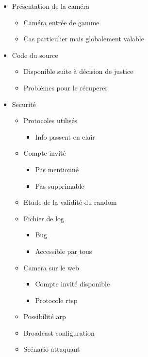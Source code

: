 \begin{itemize}
\item Présentation de la caméra
  \begin{itemize}
  \item Caméra entrée de gamme
  \item Cas particulier mais globalement valable
  \end{itemize}
\item Code du source
  \begin{itemize}
  \item Disponible suite à décision de justice
  \item Problèmes pour le récuperer
  \end{itemize}
\item Securité
  \begin{itemize}
  \item Protocoles utilisés
    \begin{itemize}
    \item Info passent en clair
    \end{itemize}
  \item Compte invité
    \begin{itemize}
    \item Pas mentionné
    \item Pas supprimable
    \end{itemize}
  \item Etude de la validité du random
  \item Fichier de log
    \begin{itemize}
    \item Bug
    \item Accessible par tous
    \end{itemize}
  \item Camera sur le web
    \begin{itemize}
    \item Compte invité disponible
    \item Protocole rtsp
    \end{itemize}
  \item Possibilité arp
  \item Broadcast configuration
  \item Scénario attaquant
  \end{itemize}
\end{itemize}